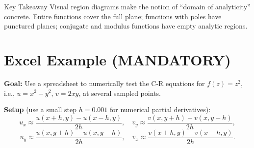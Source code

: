 \documentclass[12pt,a4paper]{article}
\begin{document}
\begin{center}
\end{center}

\begin{learnbox}{Key Takeaway}
Visual region diagrams make the notion of ``domain of analyticity'' concrete. Entire functions cover the full plane; functions with poles have punctured planes; conjugate and modulus functions have empty analytic regions.
\end{learnbox}

\section{Excel Example (MANDATORY)}

\textbf{Goal:} Use a spreadsheet to numerically test the C-R equations for
$f(z) = z^{2}$, i.e., $u = x^{2}-y^{2}$, $v = 2xy$, at several sampled points.

\textbf{Setup} (use a small step $h = 0.001$ for numerical partial derivatives):
\[
  u_x \approx \frac{u(x+h,y)-u(x-h,y)}{2h}, \quad
  v_y \approx \frac{v(x,y+h)-v(x,y-h)}{2h},
\]
\[
  u_y \approx \frac{u(x,y+h)-u(x,y-h)}{2h}, \quad
  v_x \approx \frac{v(x+h,y)-v(x-h,y)}{2h}.
\]
\end{document}
